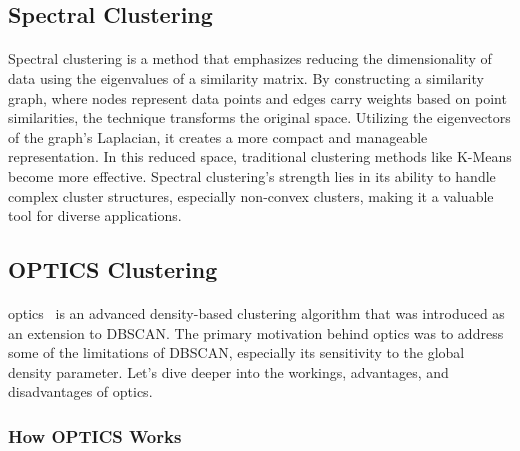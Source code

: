     \subsection{Spectral Clustering}
        \paragraph{}Spectral clustering\cite{von_luxburg_tutorial_2007} is a method that emphasizes reducing the dimensionality of data using the eigenvalues of a similarity matrix. By constructing a similarity graph, where nodes represent data points and edges carry weights based on point similarities, the technique transforms the original space. Utilizing the eigenvectors of the graph's Laplacian, it creates a more compact and manageable representation. In this reduced space, traditional clustering methods like K-Means become more effective. Spectral clustering's strength lies in its ability to handle complex cluster structures, especially non-convex clusters, making it a valuable tool for diverse applications.

    \subsection{OPTICS Clustering}\label{seq:background:optics}

        \paragraph{}\acrfull{optics}~\cite{ankerst_optics_1999} is an advanced density-based clustering algorithm that was introduced as an extension to DBSCAN. The primary motivation behind \acrshort{optics} was to address some of the limitations of DBSCAN, especially its sensitivity to the global density parameter. Let's dive deeper into the workings, advantages, and disadvantages of \acrshort{optics}.
        
        \subsubsection{How OPTICS Works}
        
